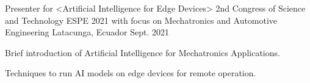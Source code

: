 

\begin{cventries}

  \cventry
    {Presenter for <Artificial Intelligence for Edge Devices>} %
    {2nd Congress of Science and Technology ESPE 2021 with focus on Mechatronics and Automotive Engineering} %
    {Latacunga, Ecuador} %
    {Sept. 2021} %
    {
      \begin{cvitems} %
        \item {Brief introduction of Artificial Intelligence for Mechatronics Applications.}
        \item {Techniques to run AI models on edge devices for remote operation.}
      \end{cvitems}
    }
\end{cventries}
